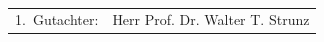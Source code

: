 \newpage
\thispagestyle{empty}
\ \vfill
\begin{tabular}{l}
\end{tabular}

\vspace{1cm}

\begin{tabular}{ll}
1.~Gutachter: & Herr Prof. Dr. Walter T. Strunz\\
\end{tabular}

\newpage
\thispagestyle{empty}
\section*{}
\section*{}
\tableofcontents
